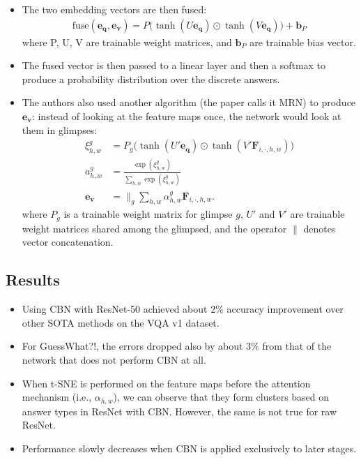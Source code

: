 \documentclass[10pt]{article}
\newcommand{\ve}[1]{\mathbf{#1}}
\begin{document}
\begin{itemize}
    \item The two embedding vectors are then fused:
    \begin{align*}
        \mathrm{fuse}(\ve{e}_{\ve{q}}, \ve{e}_{\ve{v}}) = P\big( \tanh(U \ve{e}_{\ve{q}}) \odot \tanh(V \ve{e}_{\ve{q}}) \big) + \ve{b}_P
    \end{align*}
    where P, U, V are trainable weight matrices, and $\ve{b}_P$ are trainable bias vector.

    \item The fused vector is then passed to a linear layer and then a softmax to produce a probability distribution over the discrete answers.

    \item The authors also used another algorithm \cite{Kim:2016} (the paper calls it MRN) to produce $\ve{e}_{\ve{v}}$: instead of looking at the feature maps once, the network would look at them in glimpses:
    \begin{align*}
    	\xi_{h,w}^g 
    	&= P_{g} \big( \tanh(U'\ve{e}_{\ve{q}}) \odot \tanh(V' \ve{F}_{i,\cdot,h,w}) \big) \\
    	a_{h,w}^g
    	&= \frac{\exp(\xi^g_{h,w})}{\sum_{h,w} \exp(\xi^g_{h,w})} \\
    	\ve{e}_{\ve{v}} &= 
    	\bigg\|_g \sum_{h,w}  \alpha^g_{h,w} \ve{F}_{i,\cdot, h, w}.
    \end{align*}
    where $P_g$ is a trainable weight matrix for glimpse $g$, $U'$ and $V'$ are trainable weight matrices shared among the glimpsed, and the operator $\|$ denotes vector concatenation.
  \end{itemize}

  \subsection{Results}

  \begin{itemize}
  	\item Using CBN with ResNet-50 achieved about $2\%$ accuracy improvement over other SOTA methods on the VQA v1 dataset.

  	\item For GuessWhat?!, the errors dropped also by about $3\%$ from that of the network that does not perform CBN at all.

  	\item When t-SNE is performed on the feature maps before the attention mechanism (i.e., $\alpha_{h,w}$), we can observe that they form clusters based on answer types in ResNet with CBN. However, the same is not true for raw ResNet.

  	\item Performance slowly decreases when CBN is applied exclusively to later stages.
  \end{itemize}
\end{document}
